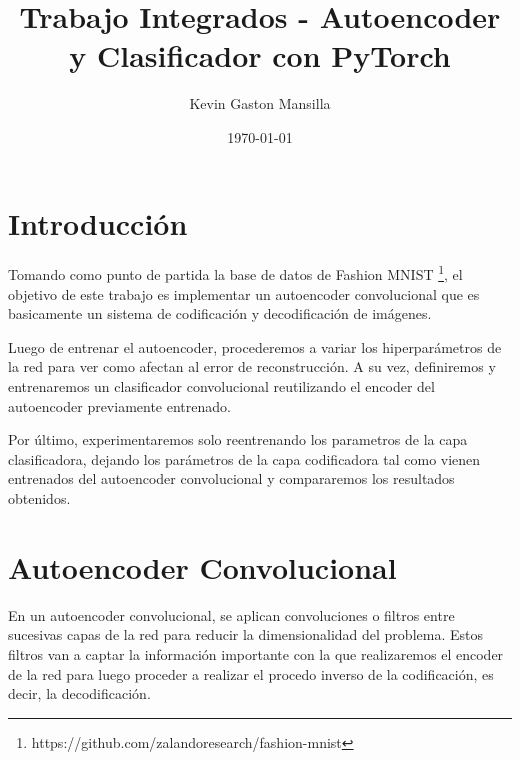 \documentclass[aps,prl,reprint,groupedaddress]{revtex4-2}
\begin{document}
\title{
Trabajo Integrados - Autoencoder y Clasificador con PyTorch
}

\author{Kevin Gaston Mansilla}

\affiliation{}

\date{\today}

\begin{abstract}
\end{abstract}


\maketitle

\section{Introducción}

Tomando como punto de partida la base de datos de Fashion MNIST
\footnote{https://github.com/zalandoresearch/fashion-mnist}, el objetivo de 
este trabajo es implementar un autoencoder convolucional que es basicamente 
un sistema de codificación y decodificación de imágenes. 

Luego de entrenar el autoencoder, procederemos a variar los hiperparámetros de 
la red para ver como afectan al error de reconstrucción. A su vez, definiremos y 
entrenaremos un clasificador convolucional reutilizando el encoder del 
autoencoder previamente entrenado. 

Por último, experimentaremos solo reentrenando los parametros de la capa 
clasificadora, dejando los parámetros de la capa codificadora tal como 
vienen entrenados del autoencoder convolucional y compararemos los resultados 
obtenidos.

\section{Autoencoder Convolucional}
En un autoencoder convolucional, se aplican convoluciones o filtros entre 
sucesivas capas de la red para reducir la dimensionalidad del problema. Estos 
filtros van a captar la información importante con la que realizaremos el encoder 
de la red para luego proceder a realizar el procedo inverso de la codificación,
es decir, la decodificación.
\end{document}
